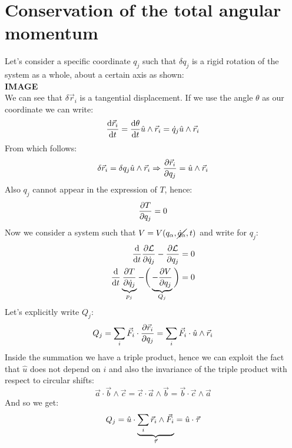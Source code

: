 \section{Conservation of the total angular momentum}
Let's consider a specific coordinate $q_j$ such that $\delta q_j$ is a rigid rotation of the system as a whole, about a certain axis as shown:
\\\textbf{IMAGE}\\
We can see that $\delta \vec{r}_i$ is a tangential displacement. If we use the angle $\theta$ as our coordinate we can write:
\begin{equation}
    \dfrac{\mathrm{d}\vec{r}_i }{\mathrm{d}t} = \dfrac{\mathrm{d}\theta }{\mathrm{d}t} \hat{u} \wedge \vec{r}_i = \dot{q}_j \hat{u} \wedge \vec{r}_i
\end{equation}
From which follows:
\begin{equation}
    \delta \vec{r}_i = \delta q_j \hat{u} \wedge \vec{r}_i \Rightarrow \dfrac{\partial \vec{r}_i}{\partial q_j} = \hat{u} \wedge \vec{r}_i
\end{equation}
Also $q_j$ cannot appear in the expression of $T$, hence:
\begin{equation}
    \dfrac{\partial T}{\partial q_j} = 0
\end{equation}
Now we consider a system such that $V = V(q_{\alpha},\cancel{\dot{q}_{\alpha}},t)$ and write \eleref\;for $q_j$:
\begin{equation} \label{e:ele_for_angular_momentum}
    \begin{split}
        \dfrac{\mathrm{d} }{\mathrm{d}t}\dfrac{\partial \mathcal{L}}{\partial \dot{q}_j} - \dfrac{\partial \mathcal{L}}{\partial q_j} = 0\\
        \dfrac{\mathrm{d} }{\mathrm{d}t}\underbrace{\dfrac{\partial T}{\partial \dot{q}_j}}_{p_j} - \bigg(\underbrace{- \dfrac{\partial V}{\partial q_j}}_{Q_j}\bigg) = 0
    \end{split}
\end{equation}
Let's explicitly write $Q_j$:
\begin{equation}
    Q_j = \displaystyle\sum_i \vec{F}_i \cdot \dfrac{\partial \vec{r}_i}{\partial q_j} = \displaystyle\sum_i \vec{F}_i \cdot \hat{u} \wedge \vec{r}_i
\end{equation}
Inside the summation we have a triple product, hence we can exploit the fact that $\hat{u}$ does not depend on $i$ and also the invariance of the triple product with respect to circular shifts:
\begin{equation}
    \vec{a} \cdot \vec{b} \wedge \vec{c} = \vec{c} \cdot \vec{a} \wedge \vec{b} = \vec{b} \cdot \vec{c} \wedge \vec{a}
\end{equation}
And so we get:
\begin{equation}
    Q_j = \hat{u} \cdot \underbrace{\displaystyle\sum_i \vec{r}_i \wedge \vec{F}_i}_{\vec{\tau}} = \hat{u} \cdot \vec{\tau}
\end{equation}

